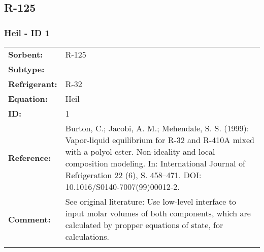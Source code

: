 \subsection{R-125 }
%
\subsubsection{Heil - ID 1}
%
\begin{tabular}[l]{|lp{11.5cm}|}
\hline
\addlinespace

\textbf{Sorbent:} & R-125 \\
\textbf{Subtype:} &  \\
\textbf{Refrigerant:} & R-32 \\
\textbf{Equation:} & Heil \\
\textbf{ID:} & 1 \\
\textbf{Reference:} & Burton, C.; Jacobi, A. M.; Mehendale, S. S. (1999): Vapor-liquid equilibrium for R-32 and R-410A mixed with a polyol ester. Non-ideality and local composition modeling. In: International Journal of Refrigeration 22 (6), S. 458–471. DOI: 10.1016/S0140-7007(99)00012-2. \\
\textbf{Comment:} & See original literature: Use low-level interface to input molar volumes of both components, which are calculated by propper equations of state, for calculations. \\

\addlinespace
\hline
\end{tabular}
\newline


